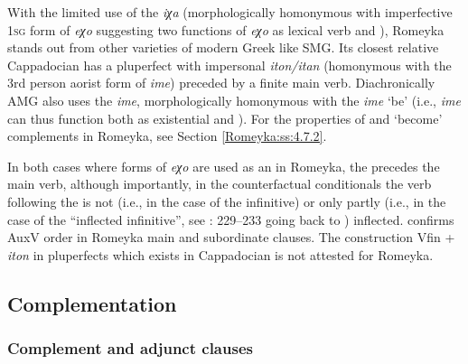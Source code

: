 \documentclass[output=paper,colorlinks,citecolor=brown]{langscibook}
\begin{document}

With the limited use of the  \textit{iχa} (morphologically homonymous with imperfective \textsc{1sg} form of \textit{eχo} suggesting two functions of \textit{eχo} as lexical verb and ), Romeyka stands out from other varieties of modern Greek like SMG. Its closest relative Cappadocian has a pluperfect with impersonal \textit{iton/itan} (homonymous with the 3rd person aorist form of \textit{ime}) preceded by a finite main verb. Diachronically AMG also uses the  \textit{ime}, morphologically homonymous with the  \textit{ime} `be' (i.e., \textit{ime} can thus function both as existential and ). For the  properties of  and `become' complements in Romeyka, see Section \ref{Romeyka:ss:4.7.2}.

In both cases where forms of \textit{eχo} are used as an  in Romeyka, the  precedes the main verb, although importantly, in the counterfactual conditionals the verb following the  is not (i.e., in the case of the infinitive) or only partly (i.e., in the case of the ``inflected infinitive'', see \citealt{schreibergrammar2022}: 229--233 going back to \citealt{sitaridouModality2014}) inflected. \citet[269]{neocleous_word_2020} confirms AuxV order in Romeyka main and subordinate clauses. The construction Vfin + \textit{iton} in pluperfects which exists in Cappadocian is not attested for Romeyka.

\subsection{Complementation}\label{Romeyka:ss:4.7}

\subsubsection{Complement and adjunct clauses}\label{Romeyka:ss:4.7.1}
\end{document}
